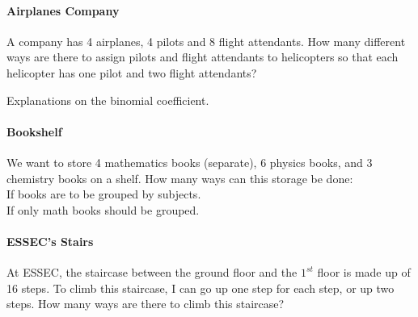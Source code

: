 \documentclass[a4paper,12pt]{article}
\begin{document}
	\paragraph{Airplanes Company}
	A company has 4 airplanes, 4 pilots and 8 flight attendants.
	How many different ways are there to assign pilots and flight attendants to helicopters so that each helicopter has one pilot and two flight attendants?
	
	Explanations on the binomial coefficient.
	
	\paragraph{Bookshelf}
	We want to store 4 mathematics books (separate), 6 physics books, and 3 chemistry books on a shelf.
	How many ways can this storage be done:\\
	If books are to be grouped by subjects.\\
	If only math books should be grouped.
	
	\paragraph{ESSEC's Stairs}
	At ESSEC, the staircase between the ground floor and the $1^{st}$ floor is made up of 16 steps.
	To climb this staircase, I can go up one step for each step, or up two steps. How many ways are there to climb this staircase?
	
	
	
\end{document}
